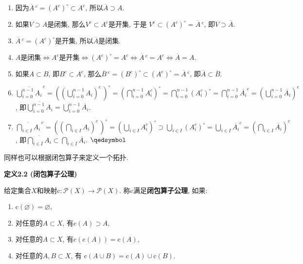 
\begin{enumerate}
    \item 因为$\overline{A}\,^c=(A^c)^\circ\subset A^c$,
    所以$\overline{A}\supset A$.
    \item 如果$V\supset A$是闭集, 那么$V^c\subset A^c$是开集, 于是
    $V^c\subset(A^c)^\circ=\overline{A}\,^c$, 即$V\supset\overline{A}$.
    \item $\overline{A}\,^c=(A^c)^\circ$是开集, 所以$\overline{A}$是闭集.
    \item $A$是闭集$\iff A^c$是开集$\iff(A^c)^\circ=A^c\iff
    \overline{A}\,^c=A^c\iff\overline{A}=A$.
    \item 如果$A\subset B$, 即$B^c\subset A^c$,
    那么$\overline{B}\,^c=(B^c)^\circ\subset(A^c)^\circ=\overline{A}\,^c$,
    即$\overline{A}\subset\overline{B}$.

    \vspace{3pt}
    \item $\displaystyle\overline{\bigcup_{i=0}^{n-1}A_i}^{\,c}=
    \left(\left(\bigcup_{i=0}^{n-1}A_i\right)^c\,\right)^\circ=
    \left(\bigcap_{i=0}^{n-1}A_i^c\right)^\circ=
    \bigcap_{i=0}^{n-1}(A_i^c)^\circ=\bigcap_{i=0}^{n-1}\overline{A_i}^c=
    \left(\bigcup_{i=0}^{n-1}\overline{A_i}\right)^c$, 即$\displaystyle
    \overline{\bigcup_{i=0}^{n-1}A_i}=\bigcup_{i=0}^{n-1}\overline{A_i}$.

    \vspace{3pt}
    \item $\displaystyle\overline{\bigcap_{i\in I}A_i}^{\,c}=
    \left(\left(\bigcap_{i\in I}A_i\right)^c\,\right)^\circ=
    \left(\bigcup_{i\in I}A_i^c\right)^\circ\supset
    \bigcup_{i\in I}(A_i^c)^\circ=\bigcup_{i\in I}\overline{A_i}^c=
    \left(\bigcap_{i\in I}\overline{A_i}\right)^c$, 即$\displaystyle
    \overline{\bigcap_{i\in I}A_i}\subset\bigcap_{i\in I}\overline{A_i}$.
    \hfill $\qedsymbol$
\end{enumerate}





\newpage

同样也可以根据闭包算子来定义一个拓扑.

\vspace{10pt}

\hypertarget{sec:定义2.2}{}
\noindent\textbf{定义2.2 (闭包算子公理)}

给定集合$X$和映射$\mathrm{c}:\mathcal{P}(X)\to\mathcal{P}(X)$.
称$\mathrm{c}$满足\textbf{闭包算子公理}, 如果:
\begin{enumerate}
    \item $\mathrm{c}(\varnothing)=\varnothing$,
    \item 对任意的$A\subset X$, 有$\mathrm{c}(A)\supset A$,
    \item 对任意的$A\subset X$, 有$\mathrm{c}(\mathrm{c}(A))=\mathrm{c}(A)$,
    \item 对任意的$A,B\subset X$, 有
    $\mathrm{c}(A\cup B)=\mathrm{c}(A)\cup\mathrm{c}(B)$.
\end{enumerate}

